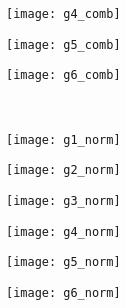 \begin{figure}[h]
\begin{subfigure}[b]{0.16\textwidth}
	\centering
	\texttt{[image: g4\_comb]}
\end{subfigure}
\begin{subfigure}[b]{0.16\textwidth}
	\centering
	\texttt{[image: g5\_comb]}
\end{subfigure}
\begin{subfigure}[b]{0.16\textwidth}
	\centering
	\texttt{[image: g6\_comb]}
\end{subfigure}\\
\vspace{0.3cm}
\begin{subfigure}[b]{0.16\textwidth}
	\centering
	\texttt{[image: g1\_norm]}
\end{subfigure}
\begin{subfigure}[b]{0.16\textwidth}
	\centering
	\texttt{[image: g2\_norm]}
\end{subfigure}
\begin{subfigure}[b]{0.16\textwidth}
	\centering
	\texttt{[image: g3\_norm]}
\end{subfigure}
\begin{subfigure}[b]{0.16\textwidth}
	\centering
	\texttt{[image: g4\_norm]}
\end{subfigure}
\begin{subfigure}[b]{0.16\textwidth}
	\centering
	\texttt{[image: g5\_norm]}
\end{subfigure}
\begin{subfigure}[b]{0.16\textwidth}
	\centering
	\texttt{[image: g6\_norm]}
\end{subfigure}\\


\end{figure}
